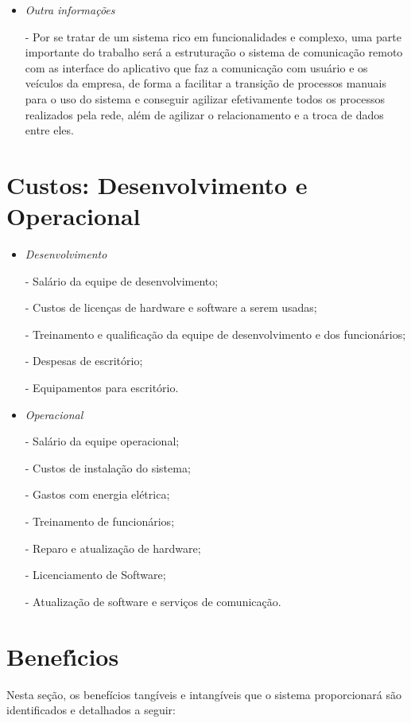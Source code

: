 \begin{itemize}
      \item \textit{Outra
                  informações}

            - Por se tratar de um sistema rico em funcionalidades e complexo, uma parte importante do trabalho será a estruturação o sistema de comunicação remoto com as interface do aplicativo que faz a  comunicação com usuário e os veículos da empresa, de forma a facilitar a transição de processos manuais para o uso do sistema e conseguir agilizar efetivamente todos os processos realizados pela rede, além de agilizar o relacionamento e a troca de dados entre eles.

\end{itemize}

\section{Custos: Desenvolvimento e Operacional}
\begin{itemize}
      \item \textit{Desenvolvimento}

            - Salário da equipe de desenvolvimento;

            - Custos de licenças de hardware e software a serem usadas;

            - Treinamento e qualificação da equipe de desenvolvimento e dos funcionários;

            - Despesas de escritório;

            - Equipamentos para escritório.



      \item \textit{Operacional}

            - Salário da equipe operacional;

            - Custos de instalação do sistema;

            - Gastos com energia elétrica;

            - Treinamento de funcionários;

            - Reparo e atualização de hardware;

            - Licenciamento de Software;

            - Atualização de software e serviços de comunicação.

\end{itemize}
\section{Benef\'{\i}cios}
Nesta seção, os benefícios tangíveis e intangíveis que o sistema proporcionará são identificados e detalhados a seguir:

